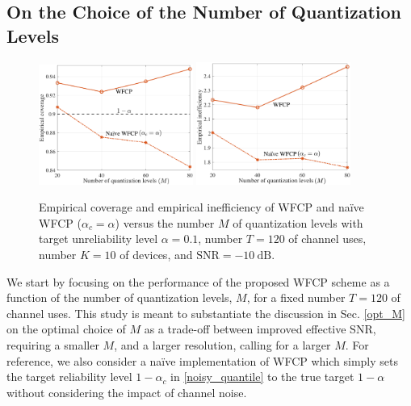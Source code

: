 \documentclass[12pt, draftclsnofoot, onecolumn]{IEEEtran}
\begin{document}
\subsection{On the Choice of the Number of Quantization Levels}
\begin{figure}[t]
    \centering
    {
	\includegraphics[width = 0.45\textwidth]{./figures/cover_M.pdf}
	\includegraphics[width = 0.45\textwidth]{./figures/ineff_M.pdf}
	}
    \caption{Empirical coverage and empirical inefficiency of WFCP and na\"ive WFCP ($\alpha_c=\alpha$) versus the number $M$ of quantization levels with target unreliability level $\alpha=0.1$, number $T = 120$ of channel uses, number $K=10$ of devices, and $\text{SNR}=-10~\text{dB}$.
    }
    \label{performance_M}
\end{figure}

We start by focusing on the performance of the proposed WFCP scheme as a function of the number of quantization levels, $M$, for a fixed number $T=120$ of channel uses. This study is meant to substantiate the discussion in Sec. \ref{opt_M} on the optimal choice of $M$ as a trade-off between improved effective SNR, requiring a smaller $M$, and a larger resolution, calling for a larger $M$. For reference, we also consider a na\"ive implementation of WFCP which simply sets the target reliability level $1-\alpha_c$ in \eqref{noisy_quantile} to the true target $1-\alpha$ without considering the impact of channel noise.
\end{document}
